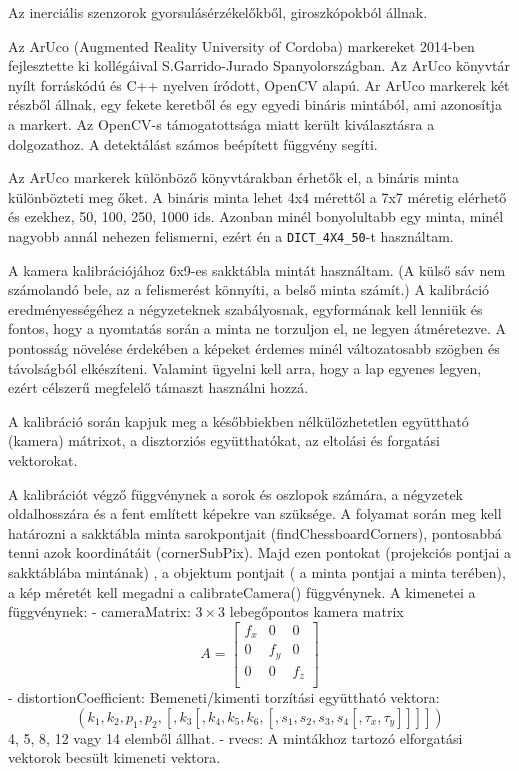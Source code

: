 Az inerciális szenzorok gyorsulásérzékelőkből, giroszkópokból állnak.



Az ArUco (Augmented Reality University of Cordoba) markereket 2014-ben fejlesztette ki kollégáival S.Garrido-Jurado Spanyolországban. 
Az ArUco könyvtár nyílt forráskódú és C++ nyelven íródott, OpenCV alapú. 
Ar ArUco markerek két részből állnak, egy fekete keretből és egy egyedi bináris mintából, ami azonosítja a markert.
Az OpenCV-s támogatottsága miatt került kiválasztásra a dolgozathoz. A detektálást számos beépített függvény segíti.

Az ArUco markerek különböző könyvtárakban érhetők el, a bináris minta különbözteti meg őket. A bináris minta lehet 4x4 mérettől a 7x7 méretig elérhető és ezekhez, 50, 100, 250, 1000 ids. Azonban minél bonyolultabb egy minta, minél nagyobb annál nehezen felismerni, ezért én a  \texttt{DICT\_4X4\_50}-t használtam.

A kamera kalibrációjához 6x9-es sakktábla mintát használtam. (A külső sáv nem számolandó bele, az a felismerést könnyíti, a belső minta számít.) 
A kalibráció eredményességéhez a négyzeteknek szabályosnak, egyformának kell lenniük és fontos, hogy a nyomtatás során a minta ne torzuljon el, ne legyen átméretezve. 
A pontosság növelése érdekében a képeket érdemes minél változatosabb szögben és távolságból elkészíteni. Valamint ügyelni kell arra, hogy a lap egyenes legyen, ezért célszerű megfelelő támaszt használni hozzá.

A kalibráció során kapjuk meg a későbbiekben nélkülözhetetlen együttható (kamera) mátrixot, a disztorziós együtthatókat, az eltolási és forgatási vektorokat.

A kalibrációt végző függvénynek a sorok és oszlopok számára, a négyzetek oldalhosszára és a fent említett képekre van szüksége.
A folyamat során meg kell határozni a sakktábla minta sarokpontjait (findChessboardCorners), pontosabbá tenni azok koordinátáit (cornerSubPix). Majd ezen pontokat (projekciós pontjai a sakktáblába mintának) , a objektum pontjait ( a minta pontjai a minta terében), a kép méretét kell megadni a calibrateCamera() függvénynek. 
A kimenetei a függvénynek:
- cameraMatrix: $3 \times 3$ lebegőpontos kamera matrix
\[
A = 
\begin{bmatrix}
f_x & 0 & 0 \\
0 & f_y & 0 \\
0 & 0 & f_z \\
\end{bmatrix}
\]
- distortionCoefficient: Bemeneti/kimenti torzítási együttható vektora:
\[
(k_1, k_2, p_1, p_2, [, k_3 [, k_4, k_5, k_6, [, s_1, s_2, s_3, s_4 [, \tau_x, \tau_y]]]])
\]
4, 5, 8, 12 vagy 14 elemből állhat.
- rvecs: A mintákhoz tartozó elforgatási vektorok becsült kimeneti vektora.

